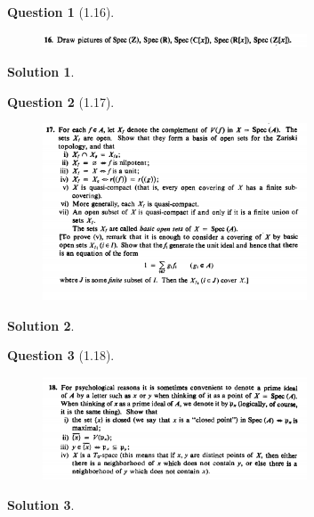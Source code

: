 \documentclass[11pt]{article}
\theoremstyle{plain}
\theoremstyle{quest}
\newtheorem*{question}{Question}
\newtheorem*{solution}{Solution}
\begin{document}
\bigskip

\begin{question}[1.16]
\hfill
\begin{figure}[h!]
  \centering
    \includegraphics[width=0.7\textwidth]{d-1-16.png}
\end{figure}
\end{question}
\begin{solution} \hfill \\


\end{solution}

\bigskip

\begin{question}[1.17]
\hfill
\begin{figure}[h!]
  \centering
    \includegraphics[width=0.7\textwidth]{d-1-17.png}
\end{figure}
\end{question}
\begin{solution} \hfill \\

\end{solution}

\bigskip

\begin{question}[1.18]
\hfill
\begin{figure}[h!]
  \centering
    \includegraphics[width=0.7\textwidth]{d-1-18.png}
\end{figure}
\end{question}
\begin{solution} \hfill \\

\end{solution}
\end{document}
